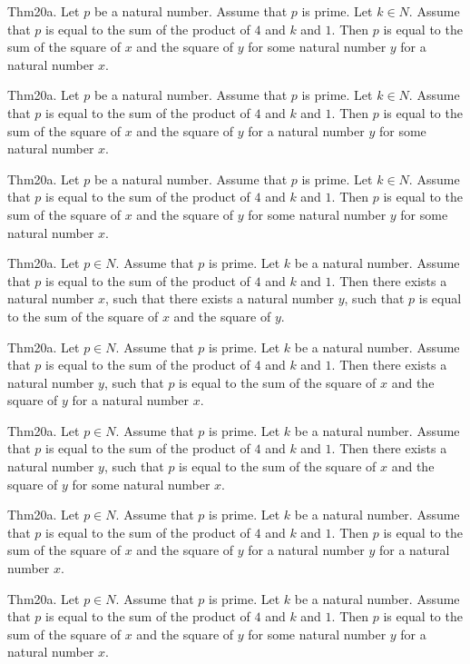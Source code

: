 \documentclass{article}
\begin{document}
Thm20a. Let $p$ be a natural number. Assume that $p$ is prime. Let $k \in N$. Assume that $p$ is equal to the sum of the product of $4$ and $k$ and $1$. Then $p$ is equal to the sum of the square of $x$ and the square of $y$ for some natural number $y$ for a natural number $x$.

Thm20a. Let $p$ be a natural number. Assume that $p$ is prime. Let $k \in N$. Assume that $p$ is equal to the sum of the product of $4$ and $k$ and $1$. Then $p$ is equal to the sum of the square of $x$ and the square of $y$ for a natural number $y$ for some natural number $x$.

Thm20a. Let $p$ be a natural number. Assume that $p$ is prime. Let $k \in N$. Assume that $p$ is equal to the sum of the product of $4$ and $k$ and $1$. Then $p$ is equal to the sum of the square of $x$ and the square of $y$ for some natural number $y$ for some natural number $x$.

Thm20a. Let $p \in N$. Assume that $p$ is prime. Let $k$ be a natural number. Assume that $p$ is equal to the sum of the product of $4$ and $k$ and $1$. Then there exists a natural number $x$, such that there exists a natural number $y$, such that $p$ is equal to the sum of the square of $x$ and the square of $y$.

Thm20a. Let $p \in N$. Assume that $p$ is prime. Let $k$ be a natural number. Assume that $p$ is equal to the sum of the product of $4$ and $k$ and $1$. Then there exists a natural number $y$, such that $p$ is equal to the sum of the square of $x$ and the square of $y$ for a natural number $x$.

Thm20a. Let $p \in N$. Assume that $p$ is prime. Let $k$ be a natural number. Assume that $p$ is equal to the sum of the product of $4$ and $k$ and $1$. Then there exists a natural number $y$, such that $p$ is equal to the sum of the square of $x$ and the square of $y$ for some natural number $x$.

Thm20a. Let $p \in N$. Assume that $p$ is prime. Let $k$ be a natural number. Assume that $p$ is equal to the sum of the product of $4$ and $k$ and $1$. Then $p$ is equal to the sum of the square of $x$ and the square of $y$ for a natural number $y$ for a natural number $x$.

Thm20a. Let $p \in N$. Assume that $p$ is prime. Let $k$ be a natural number. Assume that $p$ is equal to the sum of the product of $4$ and $k$ and $1$. Then $p$ is equal to the sum of the square of $x$ and the square of $y$ for some natural number $y$ for a natural number $x$.
\end{document}
